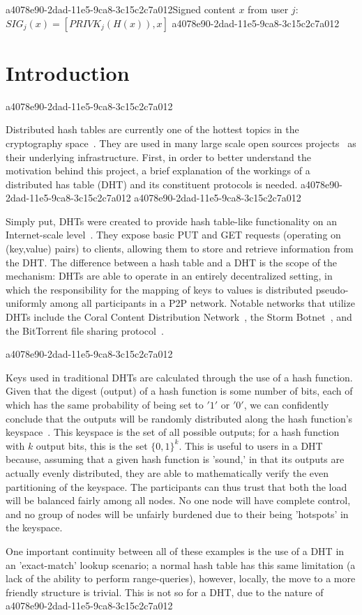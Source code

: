 \documentclass[12pt]{article}
\begin{document}
a4078e90-2dad-11e5-9ca8-3c15c2c7a012Signed content $x$ from user $j$: $SIG_j(x) = \left[ PRIVK_j( H(x) ), x \right]$
a4078e90-2dad-11e5-9ca8-3c15c2c7a012
\section{Introduction}
a4078e90-2dad-11e5-9ca8-3c15c2c7a012\par Distributed hash tables are currently one of the hottest topics in the cryptography space~\cite{Stoica:2001dj,Rowstron:2001ea,Ratnasamy:2001wn}. They are used in many large scale open sources projects~\cite{Freitas:2013tb,Xu:2010vs,Perfitt:2010fh} as their underlying infrastructure. First, in order to better understand the motivation behind this project, a brief explanation of the workings of a distributed has table (DHT) and its constituent protocols is needed.
a4078e90-2dad-11e5-9ca8-3c15c2c7a012
a4078e90-2dad-11e5-9ca8-3c15c2c7a012\par Simply put, DHTs were created to provide hash table-like functionality on an Internet-scale level~\cite{Ratnasamy:2001wn}. They expose basic PUT and GET requests (operating on (key,value) pairs) to clients, allowing them to store and retrieve information from the DHT. The difference between a hash table and a DHT is the scope of the mechanism: DHTs are able to operate in an entirely decentralized setting, in which the responsibility for the mapping of keys to values is distributed pseudo-uniformly among all participants in a P2P network. Notable networks that utilize DHTs include the Coral Content Distribution Network~\cite{Freedman:2004vb}, the Storm Botnet~\cite{Holz:2008uk}, and the BitTorrent file sharing protocol~\cite{Cohen:y1_8mBnw}.

a4078e90-2dad-11e5-9ca8-3c15c2c7a012\par Keys used in traditional DHTs are calculated through the use of a hash function. Given that the digest (output) of a hash function is some number of bits, each of which has the same probability of being set to $'1'$ or $'0'$, we can confidently conclude that the outputs will be randomly distributed along the hash function's keyspace~. This keyspace is the set of all possible outputs; for a hash function with $k$ output bits, this is the set $\{0,1\}^k$. This is useful to users in a DHT because, assuming that a given hash function is 'sound,' in that its outputs are actually evenly distributed, they are able to mathematically verify the even partitioning of the keyspace. The participants can thus trust that both the load will be balanced fairly among all nodes. No one node will have complete control, and no group of nodes will be unfairly burdened due to their being 'hotspots' in the keyspace.~

\par One important continuity between all of these examples is the use of a DHT in an 'exact-match' lookup scenario; a normal hash table has this same limitation (a lack of the ability to perform range-queries), however, locally, the move to a more friendly structure is trivial. This is not so for a DHT, due to the nature of
a4078e90-2dad-11e5-9ca8-3c15c2c7a012\printbibliography
\end{document}
